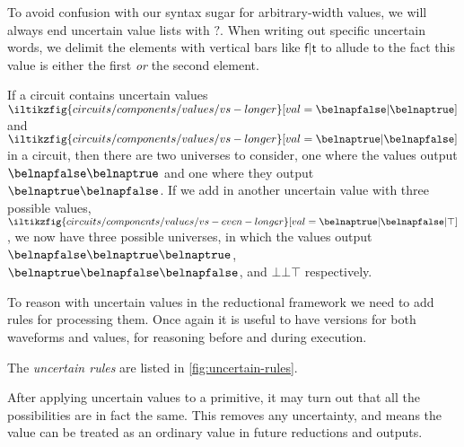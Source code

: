 To avoid confusion with our syntax sugar for arbitrary-width values, we will
always end uncertain value lists with \(?\).
When writing out specific uncertain words, we delimit the elements with vertical
bars like \(\mathsf{f}|\mathsf{t}\) to allude to the fact this value is either
the first \emph{or} the second element.

\begin{example}
    If a circuit contains uncertain values \(
    \iltikzfig{circuits/components/values/vs-longer}[val=\belnapfalse|\belnaptrue]
    \) and \(
    \iltikzfig{circuits/components/values/vs-longer}[val=\belnaptrue|\belnapfalse]
    \) in a circuit, then there are two universes to consider, one where the
    values output \(\belnapfalse\belnaptrue\) and one where they output
    \(\belnaptrue\belnapfalse\).
    If we add in another uncertain value with three possible values, \(
    \iltikzfig{circuits/components/values/vs-even-longer}[val=\belnaptrue|\belnapfalse|\top]
    \), we now have three possible universes, in which the values output
    \(\belnapfalse\belnaptrue\belnaptrue\),
    \(\belnaptrue\belnapfalse\belnapfalse\), and
    \(\bot\bot\top\) respectively.
\end{example}

To reason with uncertain values in the reductional framework we need to add
rules for processing them.
Once again it is useful to have versions for both waveforms and values, for
reasoning before and during execution.

\begin{definition}
    The \emph{uncertain rules} are listed in \cref{fig:uncertain-rules}.
\end{definition}

After applying uncertain values to a primitive, it may turn out that all the
possibilities are in fact the same.
This removes any uncertainty, and means the value can be treated as an
ordinary value in future reductions and outputs.



